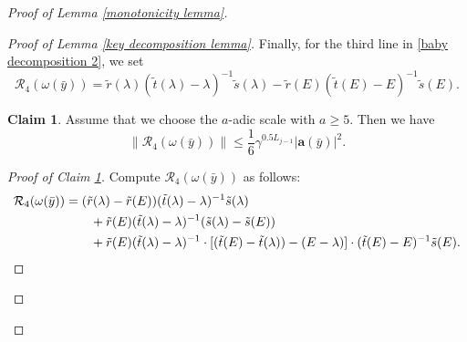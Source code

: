 \documentclass[11pt,reqno,UTF8,twoside]{amsart}
\newcommand{\ts}{\tilde{s}}
\newcommand{\tr}{\tilde{r}}
\renewcommand{\tt}{\tilde{t}}
\newcommand{\bfa}{\mathbf{a}}
\newcommand{\mcR}{\mathcal{R}}
\theoremstyle{definition}
\newtheorem{claim}[thm]{\bf Claim}
\numberwithin{equation}{section}
\begin{document}
\begin{proof}[Proof of Lemma \ref{monotonicity lemma}]
\begin{proof}[Proof of Lemma \ref{key decomposition lemma}]
Finally, for the third line in \eqref{baby decomposition 2}, we set 
\begin{equation}\label{mcR4}
  \mcR_4(\omega(\bar{y})) =\tr(\lambda) (\tt(\lambda)-\lambda)^{-1} \ts(\lambda)  -\tr(E) (\tt(E)-E)^{-1} \ts(E).
\end{equation}
\begin{claim}\label{estimate on mcR4}
  Assume that we choose the $a$-adic scale with $a\geq 5$. Then we have
  \[\|  \mcR_4(\omega(\bar{y}))  \| \leq \frac{1}{6}\gamma^{0.5L_{j-1}} |\bfa(\bar{y})|^2 .\]
\end{claim}
\begin{proof}[Proof of Claim \ref{estimate on mcR4}]
  Compute $\mcR_4(\omega(\bar{y}))$ as follows:
  \begin{align*}
    \mcR_4(\omega(\bar{y})) &=        (\tr(\lambda) -\tr(E)) (\tt(\lambda)-\lambda)^{-1} \ts(\lambda) \\
             \notag               &\qquad + \tr(E)(\tt(\lambda)-\lambda)^{-1} (\ts(\lambda)-\ts(E)) \\
                   \notag         &\qquad + \tr(E) (\tt(\lambda)-\lambda)^{-1} \cdot [(\tt(E)-\tt(\lambda))-(E-\lambda) ]\cdot (\tt(E)-E)^{-1} \ts(E).
  \end{align*}


\end{proof}
\end{proof}
\end{proof}
\end{document}
